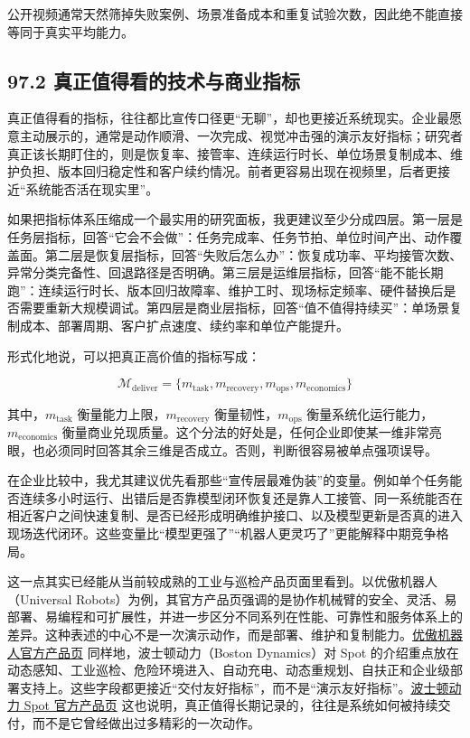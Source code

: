 公开视频通常天然筛掉失败案例、场景准备成本和重复试验次数，因此绝不能直接等同于真实平均能力。

\subsection*{97.2 真正值得看的技术与商业指标}


真正值得看的指标，往往都比宣传口径更“无聊”，却也更接近系统现实。企业最愿意主动展示的，通常是动作顺滑、一次完成、视觉冲击强的演示友好指标；研究者真正该长期盯住的，则是恢复率、接管率、连续运行时长、单位场景复制成本、维护负担、版本回归稳定性和客户续约情况。前者更容易出现在视频里，后者更接近“系统能否活在现实里”。

如果把指标体系压缩成一个最实用的研究面板，我更建议至少分成四层。第一层是任务层指标，回答“它会不会做”：任务完成率、任务节拍、单位时间产出、动作覆盖面。第二层是恢复层指标，回答“失败后怎么办”：恢复成功率、平均接管次数、异常分类完备性、回退路径是否明确。第三层是运维层指标，回答“能不能长期跑”：连续运行时长、版本回归故障率、维护工时、现场标定频率、硬件替换后是否需要重新大规模调试。第四层是商业层指标，回答“值不值得持续买”：单场景复制成本、部署周期、客户扩点速度、续约率和单位产能提升。

形式化地说，可以把真正高价值的指标写成：

\begingroup
\scriptsize
\begin{equation*}
\mathcal{M}_{\text{deliver}} = \{m_{\text{task}}, m_{\text{recovery}}, m_{\text{ops}}, m_{\text{economics}}\}
\end{equation*}
\endgroup

其中，\(m_{\text{task}}\) 衡量能力上限，\(m_{\text{recovery}}\) 衡量韧性，\(m_{\text{ops}}\) 衡量系统化运行能力，\(m_{\text{economics}}\) 衡量商业兑现质量。这个分法的好处是，任何企业即使某一维非常亮眼，也必须同时回答其余三维是否成立。否则，判断很容易被单点强项误导。

在企业比较中，我尤其建议优先看那些“宣传层最难伪装”的变量。例如单个任务能否连续多小时运行、出错后是否靠模型闭环恢复还是靠人工接管、同一系统能否在相近客户之间快速复制、是否已经形成明确维护接口、以及模型更新是否真的进入现场迭代闭环。这些变量比“模型更强了”“机器人更灵巧了”更能解释中期竞争格局。

这一点其实已经能从当前较成熟的工业与巡检产品页面里看到。以优傲机器人（Universal Robots）为例，其官方产品页强调的是协作机械臂的安全、灵活、易部署、易编程和可扩展性，并进一步区分不同系列在性能、可靠性和服务体系上的差异。这种表述的中心不是一次演示动作，而是部署、维护和复制能力。\href{https://www.universal-robots.com/products/}{优傲机器人官方产品页} 同样地，波士顿动力（Boston Dynamics）对 Spot 的介绍重点放在动态感知、工业巡检、危险环境进入、自动充电、动态重规划、自扶正和企业级部署支持上。这些字段都更接近“交付友好指标”，而不是“演示友好指标”。\href{https://bostondynamics.com/products/spot/}{波士顿动力 Spot 官方产品页} 这也说明，真正值得长期记录的，往往是系统如何被持续交付，而不是它曾经做出过多精彩的一次动作。

